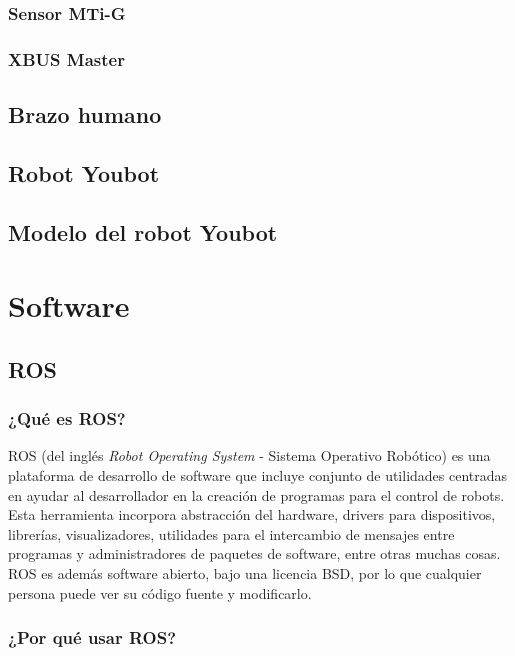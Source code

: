 \documentclass[10pt,a4paper]{report}
\begin{document}
\subsubsection{Sensor MTi-G}

\subsubsection{XBUS Master}

\subsection{Brazo humano}

\subsection{Robot Youbot}

\subsection{Modelo del robot Youbot}

\section{Software}

\subsection{ROS}

\subsubsection{¿Qué es ROS?}

ROS (del inglés \textit{Robot Operating System} - Sistema Operativo Robótico) es una plataforma de desarrollo de software que incluye conjunto de utilidades centradas en ayudar al desarrollador en la creación de programas para el control de robots. Esta herramienta incorpora abstracción del hardware, drivers para dispositivos, librerías, visualizadores, utilidades para el intercambio de mensajes entre programas y administradores de paquetes de software, entre otras muchas cosas. ROS es además software abierto, bajo una licencia BSD, por lo que cualquier persona puede ver su código fuente y modificarlo.

\subsubsection{¿Por qué usar ROS?}
\end{document}
